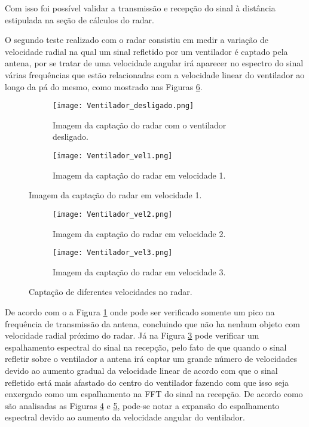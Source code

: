 Com isso foi possível validar a transmissão e recepção do sinal à distância estipulada na seção de cálculos do radar. 

O segundo teste realizado com o radar consistiu em
medir a variação de velocidade radial na qual um sinal refletido por um ventilador é captado pela antena, por se tratar de uma velocidade angular irá aparecer no espectro do sinal várias frequências que estão relacionadas com a velocidade linear do ventilador ao longo da pá do mesmo, como mostrado nas Figuras \ref{fig:velocidade}.

\begin{figure}[H]

    \centering
      \begin{subfigure}{\textwidth}
        \texttt{[image: Ventilador\_desligado.png]}
    \caption{Imagem da captação do radar com o ventilador desligado.}
    \label{Vel0}
      \end{subfigure}
      \hfill
      \begin{subfigure}{\textwidth}
       \texttt{[image: Ventilador\_vel1.png]}
    \caption{Imagem da captação do radar em velocidade 1.}
    \label{Vel1}
      \end{subfigure}

\end{figure}

\begin{figure}[H]\ContinuedFloat
    \centering
    \begin{subfigure}{\textwidth}
        \texttt{[image: Ventilador\_vel2.png]}
    \caption{Imagem da captação do radar em velocidade 2.}
    \label{Vel2}
      \end{subfigure}
\begin{subfigure}{\textwidth}
       \texttt{[image: Ventilador\_vel3.png]}
    \caption{Imagem da captação do radar em velocidade 3.}
    \label{Vel3}
      \end{subfigure}
      \caption{Captação de diferentes velocidades no radar.}
      \label{fig:velocidade}
\end{figure}



De acordo com o a Figura \ref{Vel0} onde pode ser verificado somente um pico na frequência de transmissão da antena, concluindo que não ha nenhum objeto com velocidade radial próximo do radar. Já na Figura \ref{Vel1} pode verificar um espalhamento espectral do sinal na recepção, pelo fato de que quando o sinal refletir sobre o ventilador a antena irá captar um grande número de velocidades devido ao aumento gradual da velocidade linear de acordo com que o sinal refletido está mais afastado do centro do ventilador fazendo com que isso seja enxergado como um espalhamento na FFT do sinal na recepção. De acordo como são analisadas as Figuras \ref{Vel2} e \ref{Vel3}, pode-se notar a expansão do espalhamento espectral devido ao aumento da velocidade angular do ventilador.


